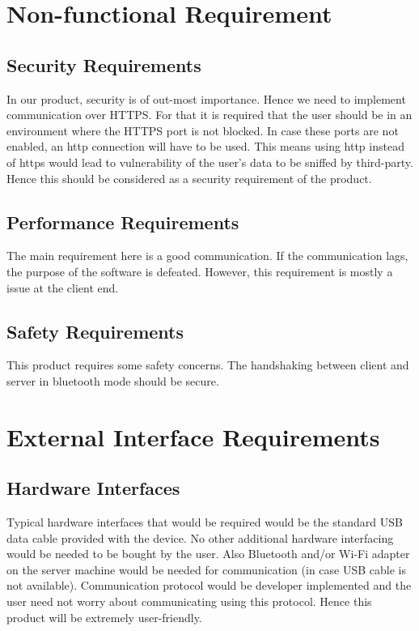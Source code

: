 \section{Non-functional Requirement}
\subsection{Security Requirements}
\hspace*{0.82cm}In our product, security is of out-most importance. Hence we need to implement
communication over HTTPS. For that it is required that the user should be in an environment where
the HTTPS port is not blocked. In case these ports are not enabled, an http connection will have to be
used. This means using http instead of https would lead to vulnerability of the user’s data to be sniffed
by third-party. Hence this should be considered as a security requirement of the product.
\subsection{Performance Requirements}
The main requirement here is a good communication. If the communication lags, the purpose of the software 
is defeated. However, this requirement is mostly a issue at the client end.
\subsection{Safety Requirements}
This product requires some safety concerns. The handshaking between client and server in bluetooth mode should 
be secure.
\newpage
\section{External Interface Requirements}
\subsection{Hardware Interfaces}
\hspace*{0.82cm}Typical hardware interfaces that would be required would be the standard USB data cable
provided with the device. No other additional hardware interfacing would be needed to be bought by
the user. Also Bluetooth and/or Wi-Fi adapter on the server machine would be needed for
communication (in case USB cable is not available). Communication protocol would be developer
implemented and the user need not worry about communicating using this protocol. Hence this
product will be extremely user-friendly.

